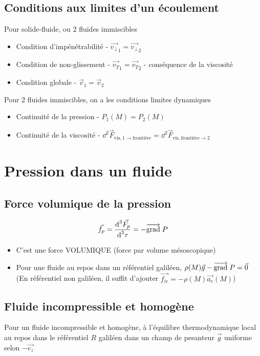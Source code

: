 \documentclass[openany]{book}
\begin{document}
\subsection{Conditions aux limites d'un écoulement}

Pour solide-fluide, ou 2 fluides immiscibles
\begin{itemize}
    \item Condition d'impénétrabilité - $\vec{v_{\perp}}_1 = \vec{v_{\perp}}_2$
    \item Condition de non-glissement - $\vec{v_{T}}_1 = \vec{v_{T}}_2$ - conséquence de la viscosité
    \item Condition globale - $\vec{v}_1 = \vec{v}_2$
\end{itemize}

Pour 2 fluides immiscibles, on a les conditions limites dynamiques
\begin{itemize}
    \item Continuité de la pression - $P_1(M) = P_2(M)$
    \item Continuité de la viscosité - $\dd^2 \vec{F}_{\text{vis}, 1\rightarrow\text{frontière}} = \dd^2 \vec{F}_{\text{vis}, \text{frontière}\rightarrow 2} $
\end{itemize}

\section{Pression dans un fluide}

\subsection{Force volumique de la pression}
\[ \vec{f_p} = \frac{\text{d}^3 \vec{F_p}}{\text{d}^3 \tau} = - \overrightarrow{{\text{grad}}} \; P \]
\begin{itemize}
    \item C'est une force VOLUMIQUE (force par volume mésoscopique)
    \item Pour une fluide au repos dans un référentiel galiléen, $\rho (M) \vec{g} - \overrightarrow{{\text{grad}}} \; P = \vec{0}$ (En référentiel non galiléen, il suffit d'ajouter $\vec{f_{ie}} = - \rho(M) \vec{a_e}(M)$)
\end{itemize}

\subsection{Fluide incompressible et homogène}
Pour un fluide incompressible et homogène, à l'équilibre thermodynamique local au repos dans le référentiel $R$ galiléen dans un champ de pesanteur $\vec{g}$ uniforme selon $-\vec{e_z}$
\end{document}
